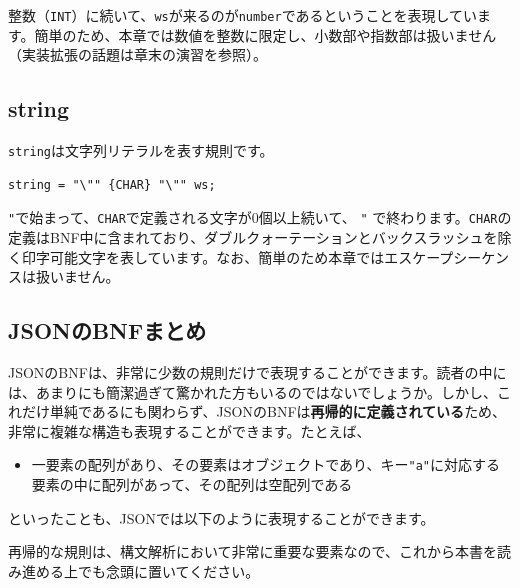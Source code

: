 整数（\texttt{INT}）に続いて、\texttt{ws}が来るのが\texttt{number}であるということを表現しています。簡単のため、本章では数値を整数に限定し、小数部や指数部は扱いません（実装拡張の話題は章末の演習を参照）。

\hypertarget{chapter3-string}{%
\subsection{string}\label{chapter3-string}}

\texttt{string}は文字列リテラルを表す規則です。

\begin{verbatim}
string = "\"" {CHAR} "\"" ws;
\end{verbatim}

\texttt{"}で始まって、\texttt{CHAR}で定義される文字が0個以上続いて、
\texttt{"}
で終わります。\texttt{CHAR}の定義はBNF中に含まれており、ダブルクォーテーションとバックスラッシュを除く印字可能文字を表しています。なお、簡単のため本章ではエスケープシーケンスは扱いません。

\hypertarget{chapter3-jsonux306ebnfux307eux3068ux3081}{%
\subsection{JSONのBNFまとめ}\label{chapter3-jsonux306ebnfux307eux3068ux3081}}

JSONのBNFは、非常に少数の規則だけで表現することができます。読者の中には、あまりにも簡潔過ぎて驚かれた方もいるのではないでしょうか。しかし、これだけ単純であるにも関わらず、JSONのBNFは\textbf{再帰的に定義されている}ため、非常に複雑な構造も表現することができます。たとえば、

\begin{itemize}
\tightlist
\item
  一要素の配列があり、その要素はオブジェクトであり、キー\texttt{"a"}に対応する要素の中に配列があって、その配列は空配列である
\end{itemize}

といったことも、JSONでは以下のように表現することができます。

\begin{Shaded}
\begin{Highlighting}[]
\OtherTok{[}\FunctionTok{\{}\FunctionTok{:}\OtherTok{[]}\FunctionTok{\}}\OtherTok{]}
\end{Highlighting}
\end{Shaded}

再帰的な規則は、構文解析において非常に重要な要素なので、これから本書を読み進める上でも念頭に置いてください。

